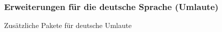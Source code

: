 \begin{frame}
    \frametitle{Erweiterungen für die deutsche Sprache (Umlaute)}
    \begin{block}{Zusätzliche Pakete für deutsche Umlaute}
        
    \end{block}
\end{frame}
